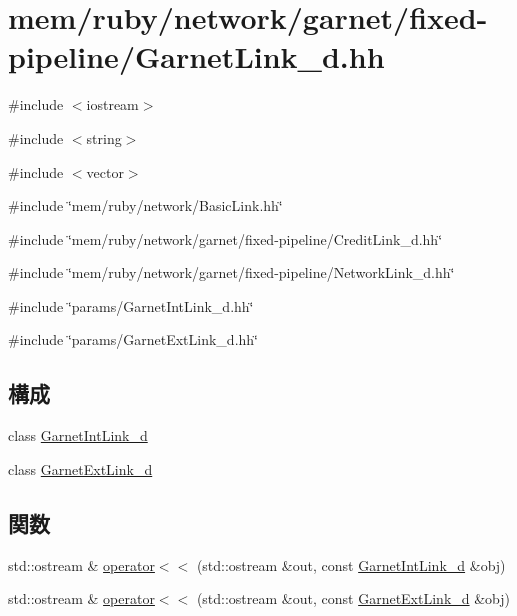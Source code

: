 \hypertarget{GarnetLink__d_8hh}{
\section{mem/ruby/network/garnet/fixed-\/pipeline/GarnetLink\_\-d.hh}
\label{GarnetLink__d_8hh}
}
{\ttfamily \#include $<$iostream$>$}\par
{\ttfamily \#include $<$string$>$}\par
{\ttfamily \#include $<$vector$>$}\par
{\ttfamily \#include \char`\"{}mem/ruby/network/BasicLink.hh\char`\"{}}\par
{\ttfamily \#include \char`\"{}mem/ruby/network/garnet/fixed-\/pipeline/CreditLink\_\-d.hh\char`\"{}}\par
{\ttfamily \#include \char`\"{}mem/ruby/network/garnet/fixed-\/pipeline/NetworkLink\_\-d.hh\char`\"{}}\par
{\ttfamily \#include \char`\"{}params/GarnetIntLink\_\-d.hh\char`\"{}}\par
{\ttfamily \#include \char`\"{}params/GarnetExtLink\_\-d.hh\char`\"{}}\par
\subsection*{構成}
\begin{DoxyCompactItemize}
\item 
class \hyperlink{classGarnetIntLink__d}{GarnetIntLink\_\-d}
\item 
class \hyperlink{classGarnetExtLink__d}{GarnetExtLink\_\-d}
\end{DoxyCompactItemize}
\subsection*{関数}
\begin{DoxyCompactItemize}
\item 
std::ostream \& \hyperlink{GarnetLink__d_8hh_ac0d97547f2e9f572fbd9fb19ae207907}{operator$<$$<$} (std::ostream \&out, const \hyperlink{classGarnetIntLink__d}{GarnetIntLink\_\-d} \&obj)
\item 
std::ostream \& \hyperlink{GarnetLink__d_8hh_a5478165c5dc34cb799cb3acbde2e2793}{operator$<$$<$} (std::ostream \&out, const \hyperlink{classGarnetExtLink__d}{GarnetExtLink\_\-d} \&obj)
\end{DoxyCompactItemize}


